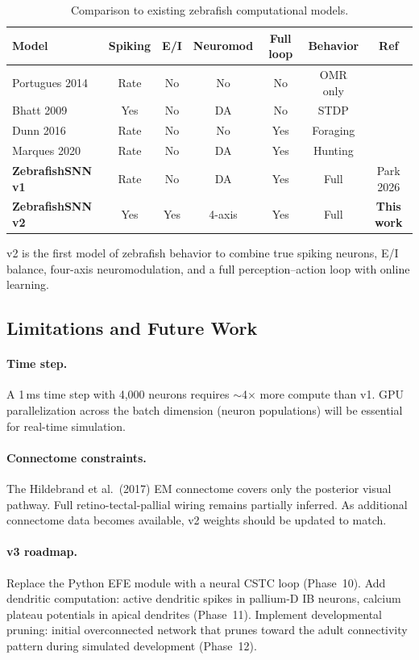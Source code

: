 \documentclass[11pt,a4paper]{article}
\begin{document}
\begin{table}[H]
\centering
\caption{Comparison to existing zebrafish computational models.}
\label{tab:comparison}
\small
\begin{tabular}{lcccccc}
\toprule
Model & Spiking & E/I & Neuromod & Full loop & Behavior & Ref \\
\midrule
Portugues 2014 & Rate & No  & No  & No  & OMR only & \cite{portugues2014} \\
Bhatt 2009     & Yes  & No  & DA  & No  & STDP     & \cite{bhatt2009} \\
Dunn 2016      & Rate & No  & No  & Yes & Foraging & \cite{dunn2016} \\
Marques 2020   & Rate & No  & DA  & Yes & Hunting  & \cite{marques2020} \\
\textbf{ZebrafishSNN v1} & Rate & No  & DA  & Yes & Full     & Park 2026 \\
\textbf{ZebrafishSNN v2} & Yes  & Yes & 4-axis & Yes & Full & \textbf{This work} \\
\bottomrule
\end{tabular}
\end{table}

\noindent v2 is the first model of zebrafish behavior to combine true spiking neurons,
E/I balance, four-axis neuromodulation, and a full perception--action loop
with online learning.

\subsection{Limitations and Future Work}

\paragraph{Time step.}
A 1\,ms time step with 4,000 neurons requires $\sim$4$\times$ more compute
than v1. GPU parallelization across the batch dimension (neuron populations)
will be essential for real-time simulation.

\paragraph{Connectome constraints.}
The Hildebrand et al.\ (2017) EM connectome covers only the posterior
visual pathway. Full retino-tectal-pallial wiring remains partially inferred.
As additional connectome data becomes available, v2 weights should be
updated to match.

\paragraph{v3 roadmap.}
Replace the Python EFE module with a neural CSTC loop (Phase~10).
Add dendritic computation: active dendritic spikes in pallium-D IB neurons,
calcium plateau potentials in apical dendrites (Phase~11).
Implement developmental pruning: initial overconnected network that prunes
toward the adult connectivity pattern during simulated development (Phase~12).
\end{document}
